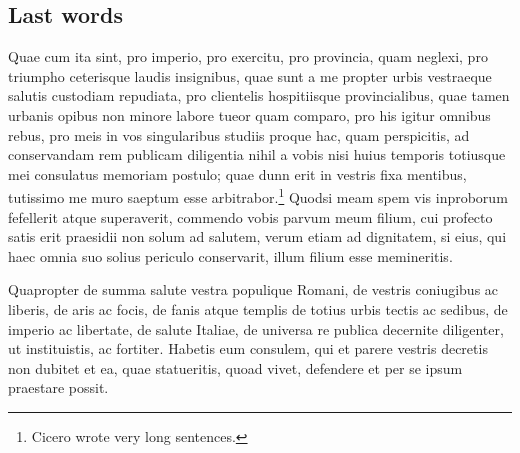 \documentclass{ifacmtg}
\begin{document}
\subsection{Last words}
 Quae cum ita sint, pro imperio, pro exercitu, pro provincia, quam
neglexi, pro triumpho ceterisque laudis insignibus, quae sunt a me
propter urbis vestraeque salutis custodiam repudiata, pro clientelis
hospitiisque provincialibus, quae tamen urbanis opibus non minore labore
tueor quam comparo, pro his igitur omnibus rebus, pro meis in vos
singularibus studiis proque hac, quam perspicitis, ad conservandam rem
publicam diligentia nihil a vobis nisi huius temporis totiusque mei
consulatus memoriam postulo; quae dunn erit in vestris fixa mentibus,
tutissimo me muro saeptum esse arbitrabor.\footnote{Cicero wrote very
  long sentences.} Quodsi meam spem vis
inproborum fefellerit atque superaverit, commendo vobis parvum meum
filium, cui profecto satis erit praesidii non solum ad salutem, verum
etiam ad dignitatem, si eius, qui haec omnia suo solius periculo
conservarit, illum filium esse memineritis. \par Quapropter de summa salute
vestra populique Romani, de vestris coniugibus ac liberis, de aris ac
focis, de fanis atque templis de totius urbis tectis ac sedibus, de
imperio ac libertate, de salute Italiae, de universa re publica
decernite diligenter, ut instituistis, ac fortiter. Habetis eum
consulem, qui et parere vestris decretis non dubitet et ea, quae
statueritis, quoad vivet, defendere et per se ipsum praestare possit.



\end{document}
